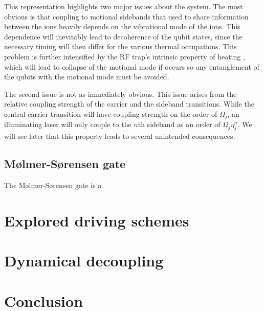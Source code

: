 \documentclass[12pt,twoside]{report}
\begin{document}
This representation highlights two major issues about the system. The most obvious is that coupling to motional sidebands that used to share information between the ions \cite{QIP_Trapped_ions} heavily depends on the vibrational mode of the ions. This dependence will inevitably lead to decoherence of the qubit states, since the necessary timing will then differ for the various thermal occupations. This problem is further intensified by the RF trap's intrinsic property of heating \cite{QIP_Trapped_ions,RF_Traps}, which will lead to collapse of the motional mode if occurs so any entanglement of the qubits with the motional mode must be avoided.

The second issue is not as immediately obvious. This issue arises from the relative coupling strength of the carrier and the sideband transitions. While the central carrier transition will have coupling strength on the order of $\Omega_j$, an illuminating laser will only couple to the  $n$th sideband as an order of $\Omega_j\eta_j^n$. We will see later that this property leads to several unintended consequences.

\section{M\o lmer-S\o rensen gate}
\label{Background:MS_gate}

The M\o lmer-S\o rensen gate is a 

\chapter{Explored driving schemes}
\label{Driving_schemes}

\chapter{Dynamical decoupling}
\label{Dynamical_decoupling}

\chapter{Conclusion}
\label{Conclusion}



\end{document}
